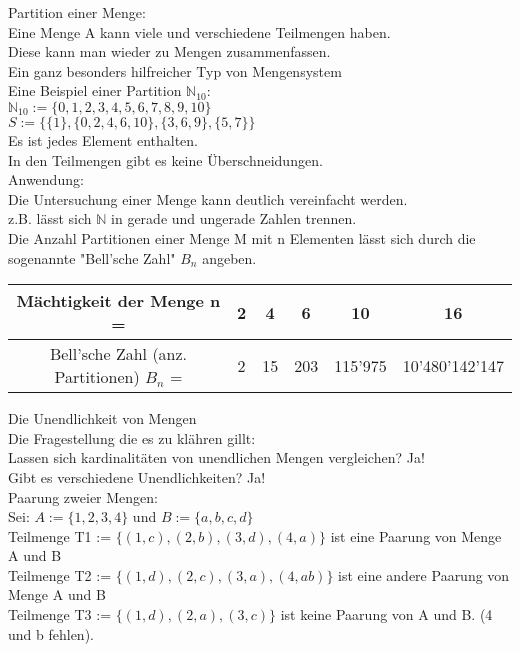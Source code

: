 \documentclass[../gruppenarbeit_1.tex]{subfiles}
\begin{document}
Partition einer Menge:\\
Eine Menge A kann viele und verschiedene Teilmengen haben.\\
Diese kann man wieder zu Mengen zusammenfassen.\\
Ein ganz besonders hilfreicher Typ von Mengensystem\\

Eine Beispiel einer Partition $\mathbb{N}_{10}$:\\
$\mathbb{N}_{10} := \{0,1,2,3,4,5,6,7,8,9,10\}$\\
$S := \{\{1\},\{0,2,4,6,10\},\{3,6,9\},\{5,7\}\}$\\
Es ist jedes Element enthalten.\\
In den Teilmengen gibt es keine Überschneidungen.\\

Anwendung:\\
Die Untersuchung einer Menge kann deutlich vereinfacht werden.\\
z.B. lässt sich $\mathbb{N}$ in gerade und ungerade Zahlen trennen.\\

Die Anzahl Partitionen einer Menge M mit n Elementen lässt sich durch die sogenannte "Bell'sche Zahl" $B_n$ angeben.\\

\begin{table}[ht]
    \begin{tabular}{c|c|c|c|c|c}
      Mächtigkeit der Menge n = & 2 & 4 & 6 & 10 & 16 \\ \hline
      Bell'sche Zahl (anz. Partitionen) $B_n$ = & 2 & 15 & 203 & 115'975 & 10'480'142'147 \\
    \end{tabular}
    \quad
\end{table}

Die Unendlichkeit von Mengen\\

Die Fragestellung die es zu klähren gillt:\\
Lassen sich kardinalitäten von unendlichen Mengen vergleichen? Ja!\\
Gibt es verschiedene Unendlichkeiten? Ja!\\

Paarung zweier Mengen:\\
Sei: $A := \{1,2,3,4\}$ und $B := \{a,b,c,d\}$\\
Teilmenge T1 := $\{(1,c),(2,b),(3,d),(4,a)\}$ ist eine Paarung von Menge A und B\\
Teilmenge T2 := $\{(1,d),(2,c),(3,a),(4,ab)\}$ ist eine andere Paarung von Menge A und B\\
Teilmenge T3 := $\{(1,d),(2,a),(3,c)\}$ ist keine Paarung von A und B. (4 und b fehlen).\\
\end{document}

